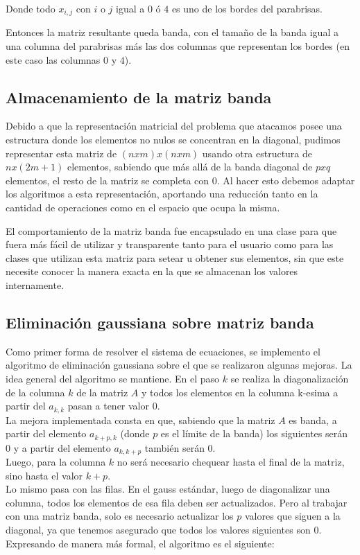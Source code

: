Donde todo $x_{i,j}$ con $i$ o $j$ igual a $0$ ó $4$ es uno de los bordes del parabrisas.

Entonces la matriz resultante queda banda, con el tamaño de la banda igual a una columna del parabrisas más las dos columnas que representan los bordes (en este caso las columnas $0$ y $4$).

\subsection{Almacenamiento de la matriz banda}

Debido a que la representación matricial del problema que atacamos posee una estructura donde los elementos no nulos se concentran en la diagonal, pudimos representar esta matriz de $(nxm)x(nxm)$ usando otra estructura de $nx(2m+1)$ elementos, sabiendo que más allá de la banda diagonal de $pxq$ elementos, el resto de la matriz se completa con $0$. Al hacer esto debemos adaptar los algoritmos a esta representación, aportando una reducción tanto en la cantidad de operaciones como en el espacio que ocupa la misma.

El comportamiento de la matriz banda fue encapsulado en una clase para que fuera más fácil de utilizar y transparente tanto para el usuario como para las clases que utilizan esta matriz para setear u obtener sus elementos, sin que este necesite conocer la manera exacta en la que se almacenan los valores internamente.

\subsection{Eliminación gaussiana sobre matriz banda}

Como primer forma de resolver el sistema de ecuaciones, se implemento el algoritmo de eliminación gaussiana sobre el que se realizaron algunas mejoras. La idea general del algoritmo se mantiene. En el paso $k$ se realiza la diagonalización de la columna $k$ de la matriz $A$ y todos los elementos en la columna k-esima a partir del $a_{k,k}$ pasan a tener valor $0$.
\\
La mejora implementada consta en que, sabiendo que la matriz $A$ es banda, a partir del elemento $a_{k+p,k}$ (donde $p$ es el límite de la banda) los siguientes serán $0$ y a partir del elemento $a_{k,k+p}$ también serán $0$.
\\
Luego, para la columna $k$ no será necesario chequear hasta el final de la matriz, sino hasta el valor $k+p$.
\\
Lo mismo pasa con las filas. En el gauss estándar, luego de diagonalizar una columna, todos los elementos de esa fila deben ser actualizados. Pero al trabajar con una matriz banda, solo es necesario actualizar los $p$ valores que siguen a la diagonal, ya que tenemos asegurado que todos los valores siguientes son $0$.
\\
Expresando de manera más formal, el algoritmo es el siguiente:

